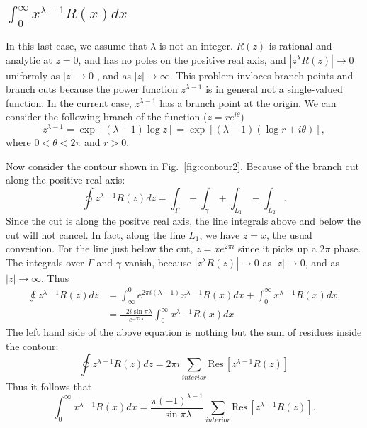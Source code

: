\documentclass[11pt, letterpaper]{article}
\begin{document}
\subsection{$\displaystyle\int_0^{\infty} x^{\lambda-1}R(x)dx$}
\label{sec:f}
In this last case, we assume that $\lambda$ is not an integer. $R(z)$ is rational and analytic at $z=0$, and has no poles on the
positive real axis, and $|z^\lambda R(z)|\rightarrow 0$ uniformly as $|z|\rightarrow 0$ , and as $|z|\rightarrow \infty$.
This problem invloces branch points and branch cuts because the power function $z^{\lambda-1}$ is in general not a single-valued
function. In the current case,  $z^{\lambda-1}$ has a branch point at the origin. We can consider the following branch of the
function ($z=re^{i\theta}$)
\begin{equation}
	z^{\lambda-1} = \exp\left[(\lambda-1)\log z\right] = \exp\left[(\lambda -1)(\log r+ i\theta)\right],
\end{equation}
where $0 < \theta < 2\pi$ and $r > 0$. 

Now consider the contour shown in Fig.~\ref{fig:contour2}. Because of the branch cut along the positive real axis:
\begin{equation}
	\oint z^{\lambda-1}R(z)dz = \int_\Gamma + \int_\gamma + \int_{L_1} + \int_{L_2}.
\end{equation}
Since the cut is along the positve real axis, the line integrals above and below the cut will not cancel. In fact, 
along the line $L_1$, we have $z=x$, the usual convention. For the line just below the cut, $z = x e^{2\pi i}$
since it picks up a $2\pi$ phase. The integrals over $\Gamma$ and $\gamma$ vanish, because
$|z^\lambda R(z)|\rightarrow 0$ as $|z|\rightarrow 0$, and as $|z|\rightarrow \infty$. Thus
\begin{align}
	\oint z^{\lambda-1}R(z)dz 
		&= \int_\infty^0 e^{2\pi i (\lambda-1)}x^{\lambda-1}R(x)dx + \int_0^\infty x^{\lambda-1}R(x)dx. \nonumber\\
		&= \frac{-2i\sin\pi\lambda}{e^{-\pi i\lambda}}\int_0^\infty x^{\lambda-1}R(x)dx
\end{align}
The left hand side of the above equation is nothing but the sum of residues inside the contour:
\begin{equation}
	\oint z^{\lambda-1} R(z)dz = 2\pi i\sum_{interior} \mbox{Res}\,\left[z^{\lambda-1}R(z)\right]
\end{equation}
Thus it follows that
\begin{equation}
	\int_0^\infty x^{\lambda-1}R(x)dx = \frac{\pi(-1)^{\lambda-1}}{\sin\pi\lambda}
				\sum_{interior} \mbox{Res}\,\left[z^{\lambda-1}R(z)\right].
\end{equation}
\end{document}
